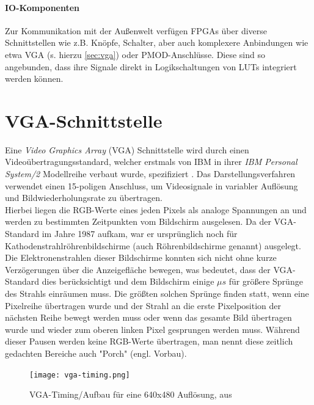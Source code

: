 \documentclass[a4paper,12pt,onesided]{report}
\begin{document}
\paragraph{IO-Komponenten}
Zur Kommunikation mit der Außenwelt verfügen FPGAs über diverse Schnittstellen wie z.B. Knöpfe, Schalter, aber auch komplexere Anbindungen wie etwa VGA (s. hierzu \autoref{sec:vga}) oder PMOD-Anschlüsse.
Diese sind so angebunden, dass ihre Signale direkt in Logikschaltungen von LUTs integriert werden können.

\section{VGA-Schnittstelle}
\label{sec:vga}
Eine \textit{Video Graphics Array} (VGA) Schnittstelle wird durch einen Videoübertragungsstandard, welcher erstmals von IBM in ihrer \textit{IBM Personal System/2} Modellreihe verbaut wurde, spezifiziert \cite{ibmTimeline}. 
Das Darstellungsverfahren verwendet einen 15-poligen Anschluss, um Videosignale in variabler Auflösung und Bildwiederholungsrate zu übertragen.\\
Hierbei liegen die RGB-Werte eines jeden Pixels als analoge Spannungen an und werden zu bestimmten Zeitpunkten vom Bildschirm ausgelesen. 
Da der VGA-Standard im Jahre 1987 aufkam, war er ursprünglich noch für  Kathodenstrahlröhrenbildschirme (auch Röhrenbildschirme genannt) ausgelegt. 
Die Elektronenstrahlen dieser Bildschirme konnten sich nicht ohne kurze Verzögerungen über die Anzeigefläche bewegen, was bedeutet, dass der VGA-Standard dies berücksichtigt und dem Bildschirm einige $\mu s$ für größere Sprünge des Strahls einräumen muss.
Die größten solchen Sprünge finden statt, wenn eine Pixelreihe übertragen wurde und der Strahl an die erste Pixelposition der nächsten Reihe bewegt werden muss oder wenn das gesamte Bild übertragen wurde und wieder zum oberen linken Pixel gesprungen werden muss.
Während dieser Pausen werden keine RGB-Werte übertragen, man nennt diese zeitlich gedachten Bereiche auch "Porch" (engl. Vorbau).\\

\begin{figure}[H]
	\centering
	\texttt{[image: vga-timing.png]}
	\caption{VGA-Timing/Aufbau für eine 640x480 Auflösung, aus \cite{vga-timing}}
	\label{fig:vga}
\end{figure}
\end{document}
